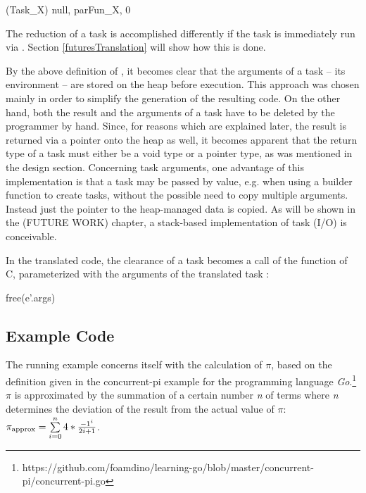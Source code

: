 \begin{ccode}
(Task_X){ null, parFun_X, 0 }
\end{ccode}

The reduction of a task is accomplished differently if the task is immediately run via . Section \ref{futuresTranslation} will show how this is done.

By the above definition of , it becomes clear that the arguments of a task -- its environment -- are stored on the heap before execution. This approach was chosen mainly in order to simplify the generation of the resulting code. On the other hand, both the result and the arguments of a task have to be deleted by the programmer by hand. Since, for reasons which are explained later, the result is returned via a pointer onto the heap as well, it becomes apparent that the return type of a task must either be a void type or a pointer type, as was mentioned in the design section. Concerning task arguments, one advantage of this implementation is that a task may be passed by value, e.g. when using a builder function to create tasks, without the possible need to copy multiple arguments. Instead just the pointer to the heap-managed data is copied. As will be shown in the (FUTURE WORK) chapter, a stack-based implementation of task (I/O) is conceivable. 

In the translated code, the clearance  of a task becomes a call of the  function of C, parameterized with the arguments of the translated task :
\begin{ccode}
free(e'.args)
\end{ccode}

\subsection{Example Code}
\label{taskExample}
The running example concerns itself with the calculation of $\pi$, based on the definition given in the concurrent-pi example for the programming language \textit{Go}.\footnote{https://github.com/foamdino/learning-go/blob/master/concurrent-pi/concurrent-pi.go} $\pi$ is approximated by the summation of a certain number \textit{n} of terms where \textit{n} determines the deviation of the result from the actual value of $\pi$: 
${\pi}_{\mathrm{approx}} = \sum\limits_{i=0}^{n}4*{-1^i \over 2i+1}$. 

